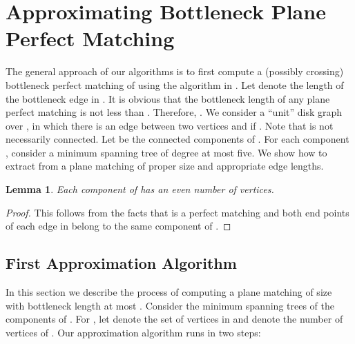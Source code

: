 \documentclass[11pt,a4paper]{article}
\newtheorem{lemma}{Lemma}
\begin{document}
\section{Approximating Bottleneck Plane Perfect Matching}
\label{bottleneck}


The general approach of our algorithms is to first compute a (possibly crossing) bottleneck perfect matching  of  using the algorithm in \cite{Chang1992}. Let  denote the length of the bottleneck edge in . It is obvious that the bottleneck length of any plane perfect matching is not less than . Therefore, . We consider a ``unit'' disk graph  over , in which there is an edge between two vertices  and  if . Note that  is not necessarily connected. Let  be the connected components of . For each component , consider a minimum spanning tree  of degree at most five. We show how to extract from  a plane matching  of proper size and appropriate edge lengths.

\begin{lemma}
 Each component of  has an even number of vertices.
\end{lemma}
\begin{proof}
This follows from the facts that  is a perfect matching and both end points of each edge in  belong to the same component of .
\end{proof}

\subsection{First Approximation Algorithm}
\label{bottleneck-five-over-two}
In this section we describe the process of computing a plane matching  of size
 with bottleneck length at most . Consider the minimum spanning trees  of the  components of . For , let  denote the set of vertices in  and  denote the number of vertices of . Our approximation algorithm runs in two steps:
\end{document}
